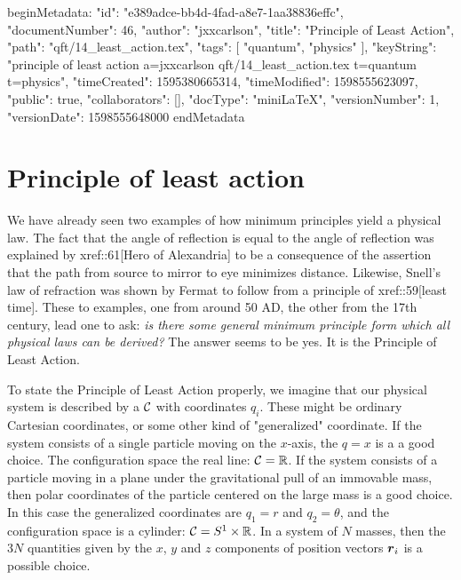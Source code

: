 beginMetadata:
{
    "id": "e389adce-bb4d-4fad-a8e7-1aa38836effc",
    "documentNumber": 46,
    "author": "jxxcarlson",
    "title": "Principle of Least Action",
    "path": "qft/14_least_action.tex",
    "tags": [
        "quantum",
        "physics"
    ],
    "keyString": "principle of least action a=jxxcarlson qft/14_least_action.tex t=quantum t=physics",
    "timeCreated": 1595380665314,
    "timeModified": 1598555623097,
    "public": true,
    "collaborators": [],
    "docType": "miniLaTeX",
    "versionNumber": 1,
    "versionDate": 1598555648000
}
endMetadata
\begin{mathmacro}
\newcommand{\bra}[0]{\langle}
\newcommand{\ket}[0]{\rangle}
\newcommand{\caF}[0]{\mathcal{F}}
\newcommand{\caA}[0]{\mathcal{A}}
\newcommand{\caC}[0]{\mathcal{C}}
\newcommand{\caP}[0]{\mathcal{P}}
\newcommand{\boR}[0]{\boldsymbol{R}}
\newcommand{\bor}[0]{\boldsymbol{r}}
\newcommand{\bov}[0]{\boldsymbol{v}}
\newcommand{\boi}[0]{\boldsymbol{i}}
\newcommand{\boa}[0]{\boldsymbol{a}}
\newcommand{\boL}[0]{\boldsymbol{L}}
\newcommand{\bbR}[0]{\mathbb{R}}
\newcommand{\sett}[2]{\{#1\ |\ #2 \}}
\end{mathmacro}

\setcounter{section}{14}

\section{Principle of least action}

We have already seen two examples of how minimum principles yield a physical law.  The fact that the angle of reflection is equal to the angle of reflection was explained by xref::61[Hero of Alexandria] to be a consequence of the assertion that the path from source to mirror to eye minimizes distance.  Likewise, Snell's law of refraction was shown by Fermat to follow from a principle of xref::59[least time]. These to examples, one from around 50 AD, the other from the 17th century, lead one to ask: \emph{is there some general minimum principle form which all physical laws can be derived?}  The answer seems to be yes.  It is the Principle of Least Action.

To state the Principle of Least Action properly, we imagine that our physical system is described by a  $\caC$ with coordinates $q_i$.  These might be ordinary Cartesian coordinates, or some other kind of "generalized" coordinate.  If the system consists of a  single particle moving on the $x$-axis, the $q = x$ is a a good choice. The configuration space the real line: $\caC = \bbR$.  If the system consists of a particle moving in a plane under the gravitational pull of an immovable mass, then polar coordinates of the  particle centered on the large mass is a good choice.   In this case the generalized coordinates are $q_1 = r$ and $q_2 = \theta$, and the configuration space is  a cylinder: $\caC = S^1\times \bbR$.   In a system of $N$ masses, then the $3N$ quantities given by the $x$, $y$ and $z$ components of position vectors $\bor_i$ is a possible choice. 

